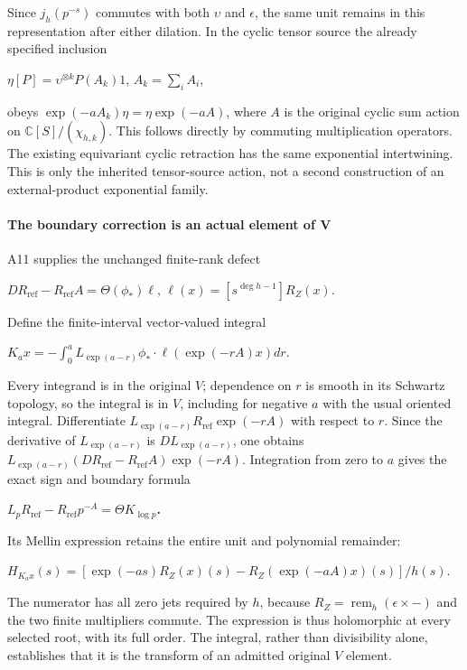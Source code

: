 Since \(j_h(p^{-s})\) commutes with both \(\upsilon\) and \(\epsilon\), the same unit remains in this representation after either dilation. In the cyclic tensor source the already specified inclusion

\(\eta[P]=\upsilon^{\otimes k} P(A_k)1\), \(A_k=\sum_i A_i\),

obeys \(\exp(-aA_k)\eta=\eta \exp(-aA)\), where \(A\) is the original cyclic sum action on \(\mathbb C[S]/(\chi_{h,k})\). This follows directly by commuting multiplication operators. The existing equivariant cyclic retraction has the same exponential intertwining. This is only the inherited tensor-source action, not a second construction of an external-product exponential family.

\paragraph{The boundary correction is an actual element of V}\label{endpoint-f1_scaling--the-boundary-correction-is-an-actual-element-of-v}

A11 supplies the unchanged finite-rank defect

\(D R_{\mathrm{ref}}-R_{\mathrm{ref}} A=\Theta(\phi_*) \ell\), \(\ell(x)=[s^{\deg h-1}]R_Z(x)\).

Define the finite-interval vector-valued integral

\(K_a x=-\int_0^a L_{\exp(a-r)}\phi_* \cdot  \ell(\exp(-rA)x) dr\).

Every integrand is in the original \(V\); dependence on \(r\) is smooth in its Schwartz topology, so the integral is in \(V\), including for negative \(a\) with the usual oriented integral. Differentiate \(L_{\exp(a-r)} R_{\mathrm{ref}} \exp(-rA)\) with respect to \(r\). Since the derivative of \(L_{\exp(a-r)}\) is \(D L_{\exp(a-r)}\), one obtains \(L_{\exp(a-r)}(D R_{\mathrm{ref}}-R_{\mathrm{ref}} A)\exp(-rA)\). Integration from zero to \(a\) gives the exact sign and boundary formula

\textbf{\(L_p R_{\mathrm{ref}}-R_{\mathrm{ref}} p^{-A}=\Theta K_{\log p}\).}

Its Mellin expression retains the entire unit and polynomial remainder:

\(H_{K_a x}(s)=[\exp(-as)R_Z(x)(s)-R_Z(\exp(-aA)x)(s)]/h(s)\).

The numerator has all zero jets required by \(h\), because \(R_Z=\operatorname{rem}_h(\epsilon\times\mathord{-})\) and the two finite multipliers commute. The expression is thus holomorphic at every selected root, with its full order. The integral, rather than divisibility alone, establishes that it is the transform of an admitted original \(V\) element.

